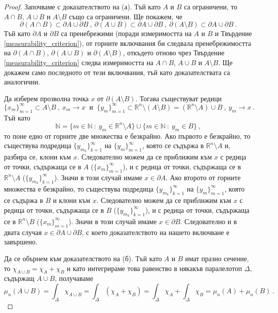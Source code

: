 \documentclass[11pt]{article}
\numberwithin{equation}{section}
\numberwithin{figure}{section}
\numberwithin{table}{section}
\theoremstyle{plain}
\theoremstyle{definition}
\theoremstyle{remark}
\theoremstyle{definition}
\theoremstyle{remark}
\theoremstyle{plain}
\theoremstyle{definition}
\theoremstyle{definition}
\theoremstyle{plain}
\theoremstyle{plain}
\theoremstyle{plain}
\theoremstyle{definition}
\theoremstyle{plain}
\newcommand*{\R}{\mathbb{R}}
\newcommand*{\N}{\mathbb{N}}
\begin{document}
\begin{proof}
Започваме с доказателството на (а). Тъй като $A$ и $B$ са ограничени, то $A \cap B$, $A\cup B$ и $A\setminus B$ също са ограничени. Ще покажем, че
$$\partial(A \cap B) \subset \partial A \cup \partial B \ , \ \partial(A\cup B) \subset \partial A \cup \partial B \ , \ \partial(A\setminus B) \subset \partial A \cup \partial B \ .$$
Тъй като $\partial A$ и $\partial B$ са пренебрежими (поради измеримостта на $A$ и $B$ и Твърдение \ref{measurability_criterion}), от горните включвания би следвала пренебрежимостта на $\partial(A \cap B)$, $\partial(A\cup B)$ и $\partial(A\setminus B)$, откъдето отново чрез Твърдение \ref{measurability_criterion} следва измеримостта на $A \cap B$, $A\cup B$ и $A\setminus B$. Ще докажем само последното от тези включвания, тъй като доказателствата са аналогични.

Да изберем прозволна точка $x$ от $\partial(A\setminus B)$. Тогава съществуват редици
$$\{ x_m\}_{m=1}^\infty \subset A\setminus B \ , \ x_m\longrightarrow x \ \mbox{ и } \ \{ y_m\}_{m=1}^\infty \subset \R^n \setminus (A\setminus B)= (\R^n \setminus A)\cup B \ , \ y_m\longrightarrow x \ .$$
Тъй като
$$\N = \{ m\in \N \ : \ y_m\in \R^n \setminus A\} \cup \{ m\in \N \ : \ y_m\in B\} \ ,$$
то поне едно от горните две множества е безкрайно. Ако първото е безкрайно, то съществува подредица $\{ y_{m_k} \}_{k=1}^\infty$ на $\{ y_m\}_{m=1}^\infty$, която се съдържа в $\R^n \setminus A$ и, разбира се, клони към $x$. Следователно можем да се приближим към $x$ с редица от точки, съдържаща се в $A$ ($\{ x_m\}_{m=1}^\infty$), и с редица от точки, съдържаща се в $\R^n \setminus A$ ($\{ y_{m_k} \}_{k=1}^\infty$). Значи в този случай имаме $x\in \partial A$. Ако второто от горните множества е безкрайно, то съществува подредица $\{ y_{m_k} \}_{k=1}^\infty$ на $\{ y_m\}_{m=1}^\infty$, която се съдържа в $B$ и клони към $x$. Следователно можем да се приближим към $x$ с редица от точки, съдържаща се в $B$ ($\{ y_{m_k} \}_{k=1}^\infty$), и с редица от точки, съдържаща се в $\R^n \setminus B$ ($\{ x_m\}_{m=1}^\infty$). Значи в този случай имаме $x\in \partial B$. Следователно и в двата случая $x\in \partial A \cup \partial B$, с което доказателството на нашето включване е завършено.

Да се обърнем към доказателството на (б). Тъй като $A$ и $B$ имат празно сечение, то $\chi_{A\cup B}=\chi_A +\chi_B$ и като интегрираме това равенство в някакъв паралелотоп $\Delta$, съдържащ $A\cup B$, получаваме
$$\mu_n(A\cup B)=\int_{\Delta} \chi_{A\cup B} = \int_{\Delta}(\chi_A +\chi_B) = \int_{\Delta}\chi_A + \int_{\Delta}\chi_B = \mu_n(A)+\mu_n(B) \ .$$
\end{proof}
\end{document}
